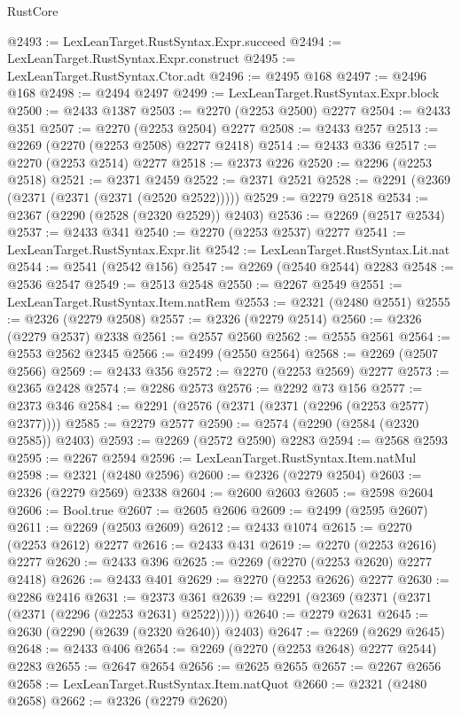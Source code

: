 \begin{lexlean}{RustCore}
\begin{coremodule}
@2493 := LexLeanTarget.RustSyntax.Expr.succeed
@2494 := LexLeanTarget.RustSyntax.Expr.construct
@2495 := LexLeanTarget.RustSyntax.Ctor.adt
@2496 := @2495 @168
@2497 := @2496 @168
@2498 := @2494 @2497
@2499 := LexLeanTarget.RustSyntax.Expr.block
@2500 := @2433 @1387
@2503 := @2270 (@2253 @2500) @2277
@2504 := @2433 @351
@2507 := @2270 (@2253 @2504) @2277
@2508 := @2433 @257
@2513 := @2269 (@2270 (@2253 @2508) @2277 @2418)
@2514 := @2433 @336
@2517 := @2270 (@2253 @2514) @2277
@2518 := @2373 @226
@2520 := @2296 (@2253 @2518)
@2521 := @2371 @2459
@2522 := @2371 @2521
@2528 := @2291 (@2369 (@2371 (@2371 (@2371 (@2520 @2522)))))
@2529 := @2279 @2518
@2534 := @2367 (@2290 (@2528 (@2320 @2529)) @2403)
@2536 := @2269 (@2517 @2534)
@2537 := @2433 @341
@2540 := @2270 (@2253 @2537) @2277
@2541 := LexLeanTarget.RustSyntax.Expr.lit
@2542 := LexLeanTarget.RustSyntax.Lit.nat
@2544 := @2541 (@2542 @156)
@2547 := @2269 (@2540 @2544) @2283
@2548 := @2536 @2547
@2549 := @2513 @2548
@2550 := @2267 @2549
@2551 := LexLeanTarget.RustSyntax.Item.natRem
@2553 := @2321 (@2480 @2551)
@2555 := @2326 (@2279 @2508)
@2557 := @2326 (@2279 @2514)
@2560 := @2326 (@2279 @2537) @2338
@2561 := @2557 @2560
@2562 := @2555 @2561
@2564 := @2553 @2562 @2345
@2566 := @2499 (@2550 @2564)
@2568 := @2269 (@2507 @2566)
@2569 := @2433 @356
@2572 := @2270 (@2253 @2569) @2277
@2573 := @2365 @2428
@2574 := @2286 @2573
@2576 := @2292 @73 @156
@2577 := @2373 @346
@2584 := @2291 (@2576 (@2371 (@2371 (@2296 (@2253 @2577) @2377))))
@2585 := @2279 @2577
@2590 := @2574 (@2290 (@2584 (@2320 @2585)) @2403)
@2593 := @2269 (@2572 @2590) @2283
@2594 := @2568 @2593
@2595 := @2267 @2594
@2596 := LexLeanTarget.RustSyntax.Item.natMul
@2598 := @2321 (@2480 @2596)
@2600 := @2326 (@2279 @2504)
@2603 := @2326 (@2279 @2569) @2338
@2604 := @2600 @2603
@2605 := @2598 @2604
@2606 := Bool.true
@2607 := @2605 @2606
@2609 := @2499 (@2595 @2607)
@2611 := @2269 (@2503 @2609)
@2612 := @2433 @1074
@2615 := @2270 (@2253 @2612) @2277
@2616 := @2433 @431
@2619 := @2270 (@2253 @2616) @2277
@2620 := @2433 @396
@2625 := @2269 (@2270 (@2253 @2620) @2277 @2418)
@2626 := @2433 @401
@2629 := @2270 (@2253 @2626) @2277
@2630 := @2286 @2416
@2631 := @2373 @361
@2639 := @2291 (@2369 (@2371 (@2371 (@2371 (@2296 (@2253 @2631) @2522)))))
@2640 := @2279 @2631
@2645 := @2630 (@2290 (@2639 (@2320 @2640)) @2403)
@2647 := @2269 (@2629 @2645)
@2648 := @2433 @406
@2654 := @2269 (@2270 (@2253 @2648) @2277 @2544) @2283
@2655 := @2647 @2654
@2656 := @2625 @2655
@2657 := @2267 @2656
@2658 := LexLeanTarget.RustSyntax.Item.natQuot
@2660 := @2321 (@2480 @2658)
@2662 := @2326 (@2279 @2620)

\end{coremodule}
\end{lexlean}

